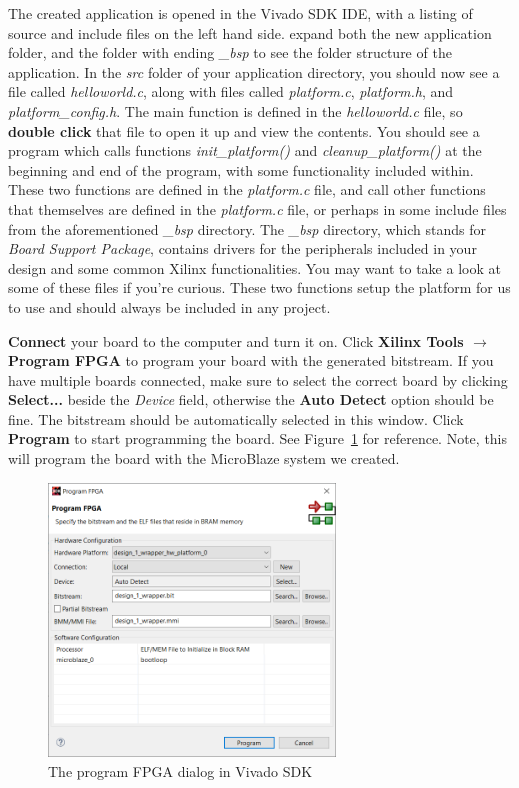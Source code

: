\documentclass[11pt]{article}
\begin{document}
The created application is opened in the Vivado SDK IDE, with a listing of source and include files on the left hand side. expand both the new application folder, and the folder with ending \textit{\_bsp} to see the folder structure of the application. In the \textit{src} folder of your application directory, you should now see a file called \textit{helloworld.c}, along with files called \textit{platform.c}, \textit{platform.h}, and \textit{platform\_config.h}. The main function is defined in the \textit{helloworld.c} file, so \textbf{double click} that file to open it up and view the contents. You should see a program which calls functions \textit{init\_platform()} and \textit{cleanup\_platform()} at the beginning and end of the program, with some functionality included within. These two functions are defined in the \textit{platform.c} file, and call other functions that themselves are defined in the \textit{platform.c} file, or perhaps in some include files from the aforementioned \textit{\_bsp} directory. The \textit{\_bsp} directory, which stands for \textit{Board Support Package}, contains drivers for the peripherals included in your design and some common Xilinx functionalities. You may want to take a look at some of these files if you're curious. These two functions setup the platform for us to use and should always be included in any project.

\newpage
\textbf{Connect} your board to the computer and turn it on. Click \textbf{Xilinx Tools $\rightarrow$ Program FPGA} to program your board with the generated bitstream. If you have multiple boards connected, make sure to select the correct board by clicking \textbf{Select...} beside the \textit{Device} field, otherwise the \textbf{Auto Detect} option should be fine. The bitstream should be automatically selected in this window. Click \textbf{Program} to start programming the board. See Figure~\ref{fig:program_fpga} for reference. Note, this will program the board with the MicroBlaze system we created.

\begin{figure}[h]
    \centering
    \includegraphics[width=0.68\textwidth]{images/program_fpga.png}
    \caption{The program FPGA dialog in Vivado SDK}
    \label{fig:program_fpga}
\end{figure}
\end{document}
